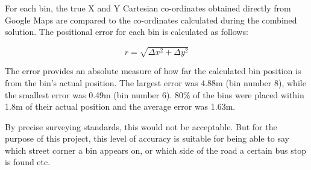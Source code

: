 For each bin, the true X and Y Cartesian co-ordinates obtained directly from Google Maps are compared to the co-ordinates calculated during the combined solution. The positional error for each bin is calculated as follows:

\begin{equation}
    r = \sqrt{\Delta x^2+\Delta y^2}
\end{equation}

The error provides an absolute measure of how far the calculated bin position is from the bin's actual position. The largest error was 4.88m (bin number 8), while the smallest error was 0.49m (bin number 6). $80\%$ of the bins were placed within 1.8m of their actual position and the average error was 1.63m.

By precise surveying standards, this would not be acceptable. But for the purpose of this project, this level of accuracy is suitable for being able to say which street corner a bin appears on, or which side of the road a certain bus stop is found etc.
